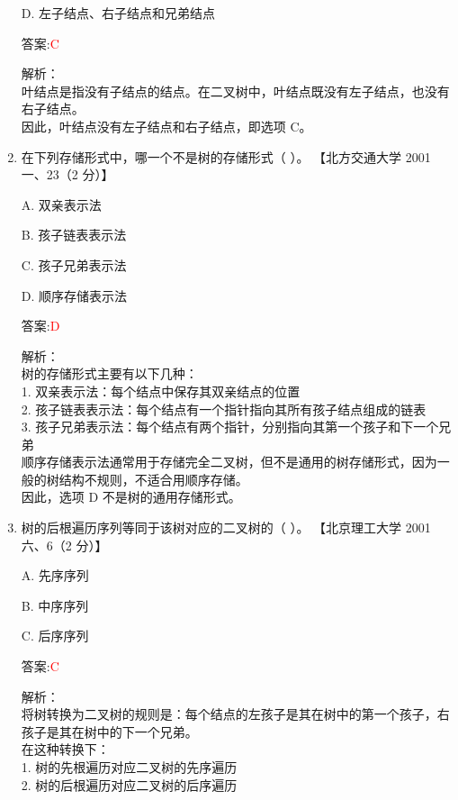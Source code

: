 \documentclass[lang=cn,newtx,10pt,scheme=chinese]{../../../elegantbook}
\begin{document}
\begin{enumerate}
    D. 左子结点、右子结点和兄弟结点  

    答案:\textcolor{red}{C}
    
    解析：\\
    叶结点是指没有子结点的结点。在二叉树中，叶结点既没有左子结点，也没有右子结点。\\
    
    因此，叶结点没有左子结点和右子结点，即选项 C。\\
    

    \item 在下列存储形式中，哪一个不是树的存储形式（ ）。  
    【北方交通大学 2001 一、23（2 分）】  

    A. 双亲表示法  

    B. 孩子链表表示法  

    C. 孩子兄弟表示法  

    D. 顺序存储表示法  

    答案:\textcolor{red}{D}
    
    解析：\\
    树的存储形式主要有以下几种：\\
    1. 双亲表示法：每个结点中保存其双亲结点的位置\\
    2. 孩子链表表示法：每个结点有一个指针指向其所有孩子结点组成的链表\\
    3. 孩子兄弟表示法：每个结点有两个指针，分别指向其第一个孩子和下一个兄弟\\
    
    顺序存储表示法通常用于存储完全二叉树，但不是通用的树存储形式，因为一般的树结构不规则，不适合用顺序存储。\\
    
    因此，选项 D 不是树的通用存储形式。\\  

    \item 树的后根遍历序列等同于该树对应的二叉树的（ ）。  
    【北京理工大学 2001 六、6（2 分）】  

    A. 先序序列  

    B. 中序序列  

    C. 后序序列  

    答案:\textcolor{red}{C}
    
    解析：\\
    将树转换为二叉树的规则是：每个结点的左孩子是其在树中的第一个孩子，右孩子是其在树中的下一个兄弟。\\
    在这种转换下：\\
    1. 树的先根遍历对应二叉树的先序遍历\\
    2. 树的后根遍历对应二叉树的后序遍历\\
    

\end{enumerate}
\end{document}
